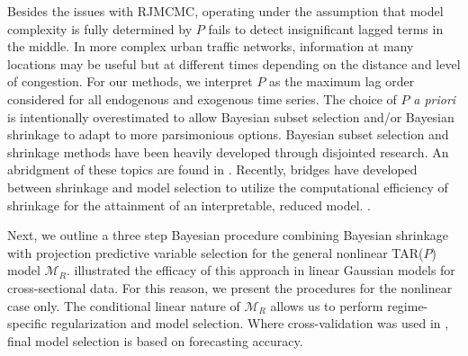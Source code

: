 Besides the issues with RJMCMC, operating under the assumption that model complexity is fully determined by $P$ fails to detect insignificant lagged terms in the middle. In more complex urban traffic networks, information at many locations may be useful but at different times depending on the distance and level of congestion. For our methods, we interpret $P$ as the maximum lag order considered for all endogenous and exogenous time series. The choice of $P$ \textit{a priori} is intentionally overestimated to allow Bayesian subset selection and/or Bayesian shrinkage to adapt to more parsimonious options. Bayesian subset selection \citep{George1993,Kuo1998,Chipman2001,Dellaportas2002} and shrinkage methods \citep{Park2008,Carvalho2009,Armagan2013,Bhattacharya2015} have been heavily developed through disjointed research. An abridgment of these topics are found in \cite{OHara2009}. Recently, bridges have developed between shrinkage and model selection to utilize the computational efficiency of shrinkage for the attainment of an interpretable, reduced model.  \citep{Lykou2013,Hahn2015,Rockova2016}.

Next, we outline a three step Bayesian procedure combining Bayesian shrinkage with projection predictive variable selection for the general nonlinear TAR($P$) model $\mathcal{M}_R$. \cite{vehtari2012,Piironen2015,Piironen2017}  illustrated the efficacy of this approach in linear Gaussian models for cross-sectional data. For this reason, we present the procedures for the nonlinear case only. The conditional linear nature of $\mathcal{M}_R$  allows us to perform regime-specific regularization and model selection. Where cross-validation was used in \cite{Piironen2015,Piironen2017}, final model selection is based on forecasting accuracy.


